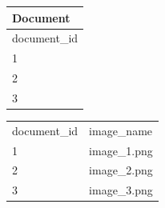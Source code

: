 \begin{table}

    \center

    \begin{tabular}{ l }
        \rowcolor{LightSlateGrey}
        \textbf{Document}\\\hline
        document\_id\\\hline
        1\\
        2\\
        3\\
    \end{tabular}
    \quad
    \begin{tabular}{ l | l }
        \rowcolor{LightSlateGrey}
        \multicolumn{2}{ c }{\textbf{Product}}\\\hline
        document\_id    & image\_name\\\hline
        1               & image\_1.png\\
        2               & image\_2.png\\
        3               & image\_3.png\\
    \end{tabular}

    ~\\


\end{table}
